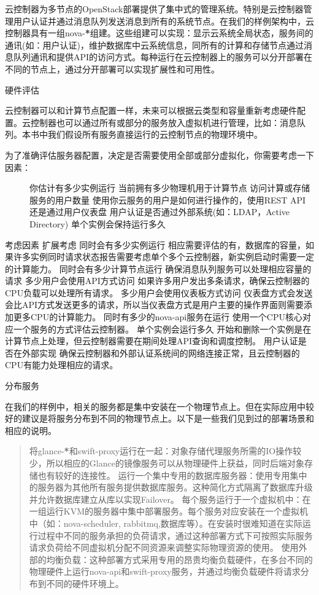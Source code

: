 \documentclass[letterpaper,10pt,english]{sphinxmanual}
\begin{document}
云控制器为多节点的OpenStack部署提供了集中式的管理系统。特别是云控制器管理用户认证并通过消息队列发送消息到所有的系统节点。在我们的样例架构中，云控制器具有一组nova-{\color{red}\bfseries{}*}组建。这些组建可以实现：显示云系统全局状态，服务间的通讯(如：用户认证)，维护数据库中云系统信息，同所有的计算和存储节点通过消息队列通讯和提供API的访问方式。每种运行在云控制器上的服务可以分开部署在不同的节点上，通过分开部署可以实现扩展性和可用性。

硬件评估

云控制器可以和计算节点配置一样，未来可以根据云类型和容量重新考虑硬件配置。云控制器也可以通过所有或部分的服务放入虚拟机进行管理，比如：消息队列。本书中我们假设所有服务直接运行的云控制节点的物理环境中。
\begin{description}
\item[{为了准确评估服务器配置，决定是否需要使用全部或部分虚拟化，你需要考虑一下因素：}] \leavevmode
你估计有多少实例运行
当前拥有多少物理机用于计算节点
访问计算或存储服务的用户数量
使用你云服务的用户是如何进行操作的，使用REST API还是通过用户仪表盘
用户认证是否通过外部系统(如：LDAP，Active Directory)
单个实例会保持运行多久

\end{description}

考虑因素                                            扩展考虑
同时会有多少实例运行                      相应需要评估的有，数据库的容量，如果许多实例同时请求状态报告需要考虑单个多个云控制器，新实例启动时需要一定的计算能力。
同时会有多少计算节点运行            确保消息队列服务可以处理相应容量的请求
多少用户会使用API方式访问          如果许多用户发出多条请求，确保云控制器的CPU负载可以处理所有请求。
多少用户会使用仪表板方式访问  仪表盘方式会发送会比API方式发送更多的请求，所以当仪表盘方式是用户主要的操作界面则需要添加更多CPU的计算能力。
同时有多少的nova-api服务在运行     使用一个CPU核心对应一个服务的方式评估云控制器。
单个实例会运行多久                               开始和删除一个实例是在计算节点上处理，但云控制器需要在期间处理API查询和调度控制。
用户认证是否在外部实现                     确保云控制器和外部认证系统间的网络连接正常，且云控制器的CPU有能力处理相应的请求。

分布服务

在我们的样例中，相关的服务都是集中安装在一个物理节点上。但在实际应用中较好的建议是将服务分布到不同的物理节点上。以下是一些我们见到过的部署场景和相应的说明。
\begin{quote}

将glance-{\color{red}\bfseries{}*}和swift-proxy运行在一起：对象存储代理服务所需的IO操作较少，所以相应的Glance的镜像服务可以从物理硬件上获益，同时后端对象存储也有较好的连接性。
运行一个集中专用的数据库服务器：使用专用集中的服务器为其他所有服务提供数据库服务。这种简化方式隔离了数据库升级并允许数据库建立从库以实现Failover。
每个服务运行于一个虚拟机中：在一组运行KVM的服务器中集中部署服务。每个服务对应安装在一个虚拟机中（如：nova-scheduler, rabbitmq,数据库等）。在安装时很难知道在实际运行过程中不同的服务承担的负荷请求，通过这种部署方式下可按照实际服务请求负荷给不同虚拟机分配不同资源来调整实际物理资源的使用。
使用外部的均衡负载：这种部署方式采用专用的昂贵均衡负载硬件，在多台不同的物理硬件上运行nova-api和swift-proxy服务，并通过均衡负载硬件将请求分布到不同的硬件环境上。
\end{quote}
\end{document}
